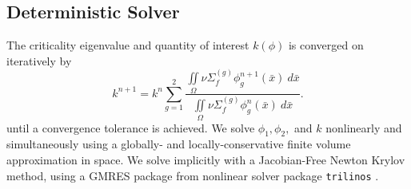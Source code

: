 \documentclass{mc2015}
\newcommand{\xs}[2]{\ensuremath{\Sigma_{#1}^{(#2)}}}
\begin{document}
\subsection{Deterministic Solver}
The criticality eigenvalue and quantity of interest $k(\phi)$ is converged on iteratively by
\begin{equation}
k^{n+1}=k^n\sum_{g=1}^2\frac{\iint\limits_\Omega\nu\xs{f}{g}\phi_g^{n+1}(\bar x)~d\bar x}{\iint\limits_\Omega\nu\xs{f}{g}\phi_g^{n}(\bar x)~d\bar x}.
\end{equation}
until a convergence tolerance is achieved.  We solve $\phi_1,\phi_2,$ and $k$ nonlinearly and simultaneously using a globally- and locally-conservative finite volume approximation in space.  We solve implicitly with a Jacobian-Free Newton Krylov method, using a GMRES package from nonlinear solver package \texttt{trilinos} \cite{Trilinos-Overview}.
\end{document}
